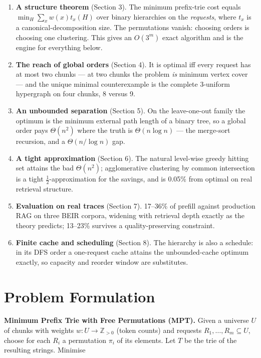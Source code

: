 \documentclass[11pt]{article}
\theoremstyle{plain}
\begin{document}
\begin{enumerate}
\item \textbf{A structure theorem} (Section 3). The minimum prefix-trie cost equals $\min_H \sum_x w(x) t_x(H)$ over binary hierarchies on the \emph{requests}, where $t_x$ is a canonical-decomposition size. The permutations vanish: choosing orders is choosing one clustering. This gives an $O(3^m)$ exact algorithm and is the engine for everything below.
\item \textbf{The reach of global orders} (Section 4). It is optimal iff every request has at most two chunks --- at two chunks the problem \emph{is} minimum vertex cover --- and the unique minimal counterexample is the complete 3-uniform hypergraph on four chunks, 8 versus 9.
\item \textbf{An unbounded separation} (Section 5). On the leave-one-out family the optimum is the minimum external path length of a binary tree, so a global order pays $\Theta(n^2)$ where the truth is $\Theta(n\log n)$ --- the merge-sort recursion, and a $\Theta(n/\log n)$ gap.
\item \textbf{A tight approximation} (Section 6). The natural level-wise greedy hitting set attains the bad $\Theta(n^2)$; agglomerative clustering by common intersection is a tight $\tfrac12$-approximation for the savings, and is 0.05\% from optimal on real retrieval structure.
\item \textbf{Evaluation on real traces} (Section 7). 17--36\% of prefill against production RAG on three BEIR corpora, widening with retrieval depth exactly as the theory predicts; 13--23\% survives a quality-preserving constraint.
\item \textbf{Finite cache and scheduling} (Section 8). The hierarchy is also a schedule: in its DFS order a one-request cache attains the unbounded-cache optimum exactly, so capacity and reorder window are substitutes.
\end{enumerate}


\section{Problem Formulation}

\textbf{Minimum Prefix Trie with Free Permutations (MPT).} Given a universe $U$ of chunks with weights $w:U\to\mathbb{Z}_{>0}$ (token counts) and requests $R_1,\dots,R_m \subseteq U$, choose for each $R_i$ a permutation $\pi_i$ of its elements. Let $T$ be the trie of the resulting strings. Minimise
\end{document}
